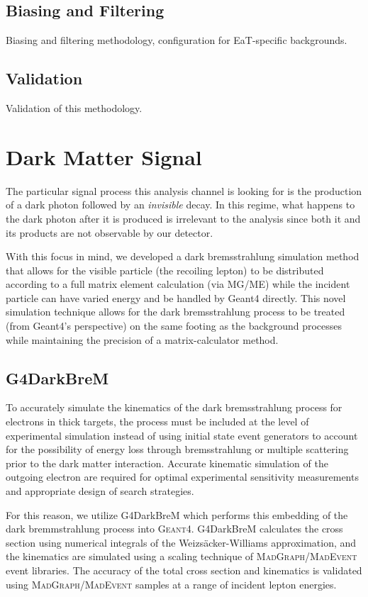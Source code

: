 \subsection{Biasing and Filtering}
Biasing and filtering methodology, configuration for EaT-specific backgrounds.

\subsection{Validation}
Validation of this methodology.

\section{Dark Matter Signal}
The particular signal process this analysis channel is looking for is the
production of a dark photon followed by an \emph{invisible} decay. In this
regime, what happens to the dark photon after it is produced is irrelevant
to the analysis since both it and its products are not observable by our
detector.

With this focus in mind, we developed a dark bremsstrahlung simulation method
that allows for the visible particle (the recoiling lepton) to be distributed
according to a full matrix element calculation (via MG/ME) while the incident
particle can have varied energy and be handled by Geant4 directly. This novel
simulation technique allows for the dark bremsstrahlung process to be treated
(from Geant4's perspective) on the same footing as the background processes
while maintaining the precision of a matrix-calculator method.

\subsection{G4DarkBreM}
To accurately simulate the kinematics of the dark bremsstrahlung process for
electrons in thick targets, the process must be included at the level of experimental
simulation instead of using initial state event generators to account for the
possibility of energy loss through bremsstrahlung or multiple scattering prior to
the dark matter interaction.
Accurate kinematic simulation of the outgoing electron are required for optimal 
experimental sensitivity measurements and appropriate design of search strategies.

For this reason, we utilize G4DarkBreM \cite{g4darkbrem} which performs this 
embedding of the dark bremmstrahlung process into \textsc{Geant}4.
G4DarkBreM calculates the cross section using numerical integrals of the
Weizs\"{a}cker-Williams approximation, and the kinematics are simulated using
a scaling technique of \textsc{MadGraph/MadEvent} event libraries.
The accuracy of the total cross section and kinematics is validated using
\textsc{MadGraph/MadEvent} samples at a range of incident lepton energies.

